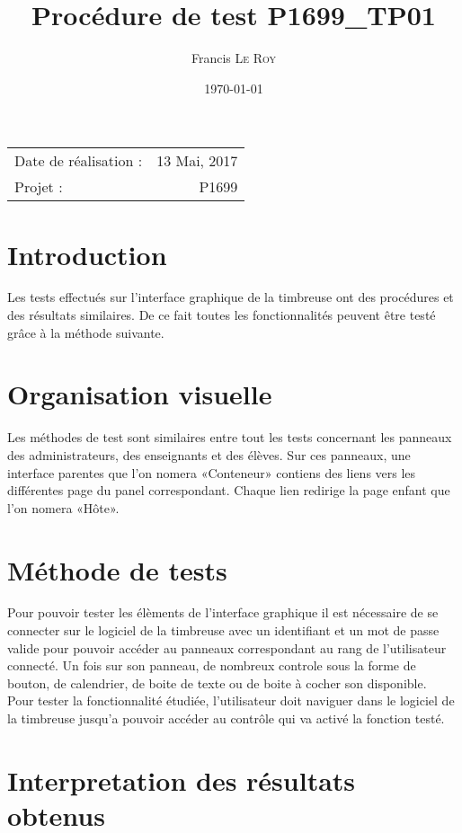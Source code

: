 \documentclass[10pt,a4paper,onecolumn]{article}
\title{Procédure de test P1699\_TP01}
\author{Francis \textsc{Le Roy}}
\date{\today}
\begin{document}
\maketitle
\thispagestyle{fancy}

\begin{center}
\begin{tabular}{l r}
Date de réalisation : & 13 Mai, 2017 \\
Projet : & P1699
\end{tabular}
\end{center}

\section{Introduction}
Les tests effectués sur l'interface graphique de la timbreuse ont des procédures et des résultats similaires. De ce fait toutes les fonctionnalités peuvent être testé grâce à la méthode suivante.
\section{Organisation visuelle}
Les méthodes de test sont similaires entre tout les tests concernant les panneaux des administrateurs, des enseignants et des élèves. Sur ces panneaux, une interface parentes que l'on nomera «Conteneur» contiens des liens vers les différentes page du panel correspondant. 
Chaque lien redirige la page enfant que l'on nomera «Hôte».\\

\section{Méthode de tests}
Pour pouvoir tester les élèments de l'interface graphique il est nécessaire de se connecter sur le logiciel de la timbreuse avec un identifiant et un mot de passe valide pour pouvoir accéder au panneaux correspondant au rang de l'utilisateur connecté. Un fois sur son panneau, de nombreux controle sous la forme de bouton, de calendrier, de boite de texte ou de boite à cocher son disponible. \\
Pour tester la fonctionnalité étudiée, l'utilisateur doit naviguer dans le logiciel de la timbreuse jusqu'a pouvoir accéder au contrôle qui va activé la fonction testé.

\section{Interpretation des résultats obtenus}
\end{document}
